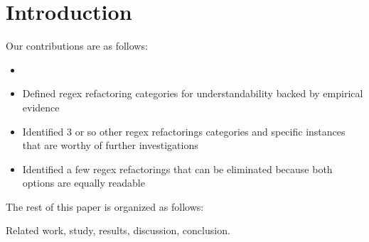 \section{Introduction }

Our contributions are as follows:
\begin{itemize}
\item 
\item {Defined regex refactoring categories for understandability backed by empirical evidence}
\item {Identified 3 or so other regex refactorings categories and specific instances that are worthy of further investigations}
\item {Identified a few regex refactorings that can be eliminated because both options are equally readable}
\end{itemize}

The rest of this paper is organized as follows:

Related work, study, results, discussion, conclusion.
